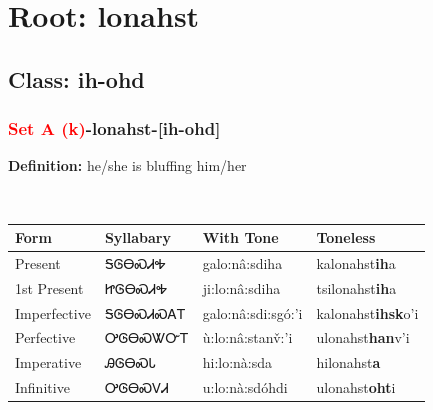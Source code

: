\needspace{4in}
\section*{Root: lonahst}
\nopagebreak
{}
\needspace{3in}
\subsection*{Class: ih-ohd}
\nopagebreak
\needspace{2in}
\subsubsection*{\textcolor{Red}{Set A (k)}{-}\textbf{lonahst}{-}[ih-ohd]}
\nopagebreak
\textbf{Definition: } he/she is bluffing him/her
\\[0.5em]
\begin{tabularx}{\textwidth}{l X X X}%
\toprule%
\textbf{Form}&\textbf{Syllabary}&\textbf{With Tone}&\textbf{Toneless}\\%
\midrule%
Present&ᎦᎶᎾᏍᏗᎭ&galo:nâ:sdiha&kalonahst\textbf{ih}a\\%
1st Present&ᏥᎶᎾᏍᏗᎭ&ji:lo:nâ:sdiha&tsilonahst\textbf{ih}a\\%
Imperfective&ᎦᎶᎾᏍᏗᏍᎪᎢ&galo:nâ:sdi:sgó:’i&kalonahst\textbf{ihsk}o'i\\%
Perfective&ᎤᎶᎾᏍᏔᏅᎢ&ù:lo:nâ:stanv̌:’i&ulonahst\textbf{han}v'i\\%
Imperative&ᎯᎶᎾᏍᏓ&hi:lo:nà:sda&hilonahst\textbf{a}\\%
Infinitive&ᎤᎶᎾᏍᏙᏗ&u:lo:nà:sdóhdi&ulonahst\textbf{oht}i\\%
\bottomrule%
\end{tabularx}
\\[1em]